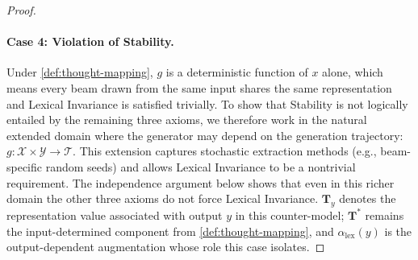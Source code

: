 \begin{proof}
\paragraph{Case 4: Violation of Stability.}
Under \cref{def:thought-mapping}, $g$ is a deterministic function of $x$ alone, which means every beam drawn from the same input shares the same representation and Lexical Invariance is satisfied trivially. To show that Stability is not logically entailed by the remaining three axioms, we therefore work in the natural extended domain where the generator may depend on the generation trajectory: $g: \mathcal{X} \times \mathcal{Y} \to \mathcal{T}$. This extension captures stochastic extraction methods (e.g., beam-specific random seeds) and allows Lexical Invariance to be a nontrivial requirement. The independence argument below shows that even in this richer domain the other three axioms do not force Lexical Invariance. $\mathbf{T}_y$ denotes the representation value associated with output $y$ in this counter-model; $\mathbf{T}^*$ remains the input-determined component from \cref{def:thought-mapping}, and $\alpha_\mathrm{lex}(y)$ is the output-dependent augmentation whose role this case isolates.


\end{proof}
